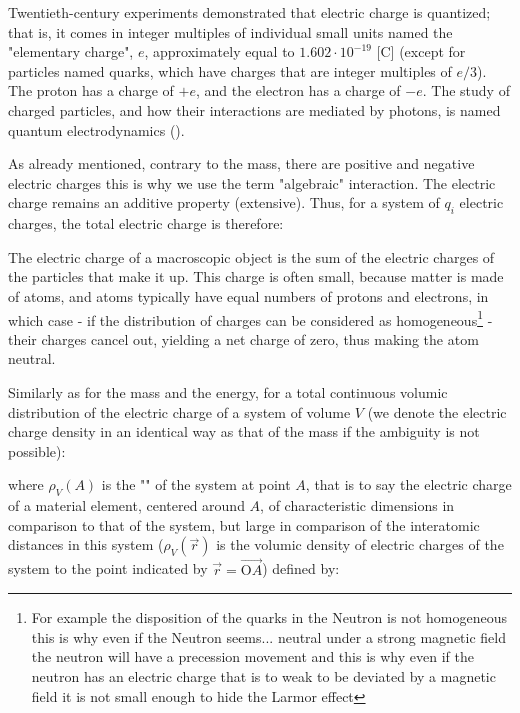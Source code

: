 	Twentieth-century experiments demonstrated that electric charge is quantized; that is, it comes in integer multiples of individual small units named the "elementary charge", $e$, approximately equal to $1.602\cdot 10^{-19}$ [C] (except for particles named quarks, which have charges that are integer multiples of $e/3$). The proton has a charge of $+e$, and the electron has a charge of $-e$. The study of charged particles, and how their interactions are mediated by photons, is named quantum electrodynamics ().
	
	As already mentioned, contrary to the mass, there are positive and negative electric charges this is why we use the term "algebraic" interaction. The electric charge remains an additive property (extensive). Thus, for a system of $q_i$ electric charges, the total electric charge is therefore:
	
	The electric charge of a macroscopic object is the sum of the electric charges of the particles that make it up. This charge is often small, because matter is made of atoms, and atoms typically have equal numbers of protons and electrons, in which case - if the distribution of charges can be considered as homogeneous\footnote{For example the disposition of the quarks in the Neutron is not homogeneous this is why even if the Neutron seems... neutral under a strong magnetic field the neutron will have a precession movement and this is why even if the neutron has an electric charge that is to weak to be deviated by a magnetic field it is not small enough to hide the Larmor effect} - their charges cancel out, yielding a net charge of zero, thus making the atom neutral.
	
	Similarly as for the mass and the energy, for a total continuous volumic distribution of the electric charge of a system of volume $V$ (we denote the electric charge density in an identical way as that of the mass if the ambiguity is not possible):
	
	where $\rho_V(A)$ is the "" of the system at point $A$, that is to say the electric charge of a material element, centered around $A$, of characteristic dimensions in comparison to that of the system, but large in comparison of the interatomic distances in this system ($\rho_V(\vec{r})$ is the volumic density of electric charges of the system to the point indicated by $\vec{r}=\overrightarrow{\text{O}A}$) defined by:
	
